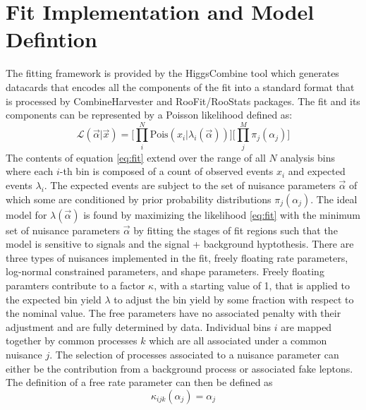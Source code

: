 




\section{Fit Implementation and Model Defintion}
The fitting framework is provided by the HiggsCombine tool which generates datacards that encodes all the components of the fit into a standard format that is processed by CombineHarvester and RooFit/RooStats packages. The fit and its components can be represented by a Poisson likelihood defined as:
\begin{equation}
\label{eq:fit}
\mathcal{L}(\vec{\alpha}|\vec{x}) = \bigg[ \prod_i^N \text{Pois}(x_i|\lambda_i(\vec{\alpha})) \bigg] \bigg[\prod_j^M \pi_j(\alpha_j) \bigg]
\end{equation}
The contents of equation \ref{eq:fit} extend over the range of all $N$ analysis bins where each $i$-th bin is composed of a count of observed events $x_i$ and expected events $\lambda_i$. The expected events are subject to the set of nuisance parameters $\vec{\alpha}$ of which some are conditioned by prior probability distributions $\pi_j(\alpha_j)$. The ideal model for $\lambda(\vec{\alpha})$ is found by maximizing the likelihood \ref{eq:fit} with the minimum set of nuisance parameters $\vec{\alpha}$ by fitting the stages of fit regions such that the model is sensitive to signals and the signal + background hyptothesis.  There are three types of nuisances implemented in the fit, freely floating rate parameters, log-normal constrained parameters, and shape parameters.  Freely floating paramters contribute to a factor $\kappa$, with a starting value of 1,  that is applied to the expected bin yield $\lambda$ to adjust the bin yield by some fraction with respect to the nominal value. The free parameters have no associated penalty with their adjustment and are fully determined by data. Individual bins $i$ are mapped together by common processes $k$ which are all associated under a common nuisance $j$. The selection of processes associated to a nuisance parameter can either be the contribution from a background process or associated fake leptons. The definition of a free rate parameter can then be defined as 
\begin{equation}
\label{eq:rateparam}
\kappa_{ijk}(\alpha_j) = \alpha_j
\end{equation}  
